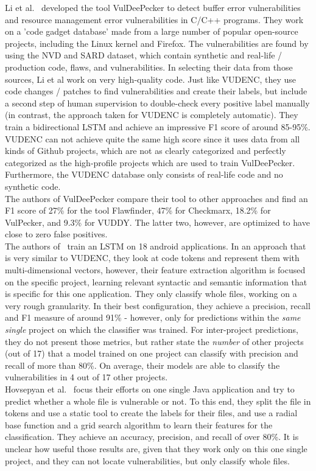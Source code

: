 \documentclass[
a4paper,
pagesize,
pdftex,
12pt,
twoside, %
BCOR=5mm, %
ngerman,
fleqn,
final,
]{scrartcl}
\begin{document}
	Li et al.~\cite{Li.2018} developed the tool VulDeePecker to detect buffer error vulnerabilities and resource management error vulnerabilities in C/C++ programs. They work on a 'code gadget database' made from a large number of popular open-source projects, including the Linux kernel and Firefox. The vulnerabilities are found by using the NVD and SARD dataset, which contain synthetic and real-life / production code, flaws, and vulnerabilities. In selecting their data from those sources, Li et al work on very high-quality code. Just like VUDENC, they use code changes / patches to find vulnerabilities and create their labels, but include a second step of human supervision to double-check every positive label manually (in contrast, the approach taken for VUDENC is completely automatic). They train a bidirectional LSTM and achieve an impressive F1 score of around 85-95\%. VUDENC can not achieve quite the same high score since it uses data from all kinds of Github projects, which are not as clearly categorized and perfectly categorized as the high-profile projects which are used to train VulDeePecker. Furthermore, the VUDENC database only consists of real-life code and no synthetic code.\\
	The authors of VulDeePecker compare their tool to other approaches and find an F1 score of 27\% for the tool Flawfinder, 47\% for Checkmarx, 18.2\% for VulPecker, and 9.3\% for VUDDY. The latter two, however, are optimized to have close to zero false positives.\\	
	The authors of~\cite{Dam.2017} train an LSTM on 18 android applications. In an approach that is very similar to VUDENC, they look at code tokens and represent them with multi-dimensional vectors, however, their feature extraction algorithm is focused on the specific project, learning relevant syntactic and semantic information that is specific for this one application. They only classify whole files, working on a very rough granularity. In their best configuration, they achieve a precision, recall and F1 measure of around 91\% - however, only for predictions within the \textit{same single} project on which the classifier was trained. For inter-project predictions, they do not present those metrics, but rather state the \textit{number} of other projects (out of 17) that a model trained on one project can classify with precision and recall of more than 80\%. On average, their models are able to classify the vulnerabilities in 4 out of 17 other projects.\\	
	Hovsepyan et al.~\cite{Hovsepyan.2012} focus their efforts on one single Java application and try to predict whether a whole file is vulnerable or not. To this end, they split the file in tokens and use a static tool to create the labels for their files, and use a radial base function and a grid search algorithm to learn their features for the classification. They achieve an accuracy, precision, and recall of over 80\%. It is unclear how useful those results are, given that they work only on this one single project, and they can not locate vulnerabilities, but only classify whole files. 
	
\end{document}
